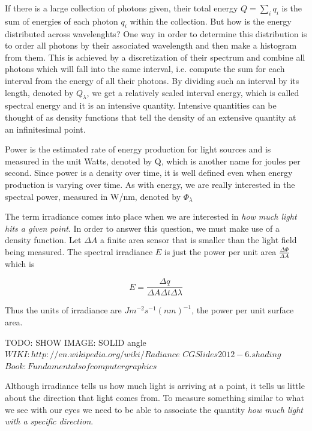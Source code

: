 If there is a large collection of photons given, their total energy $Q = \sum_i q_i$ is the sum of energies of each photon $q_i$ within the collection. But how is the energy distributed across wavelenghts? One way in order to determine this distribution is to order all photons by their associated wavelength and then make a histogram from them. This is achieved by a discretization of their spectrum and combine all photons which will fall into the same interval, i.e. compute the sum for each interval from the energy of all their photons. By dividing such an interval by its length, denoted by $Q_\lambda$, we get a relatively scaled interval energy, which is called spectral energy and it is an intensive quantity. Intensive quantities can be thought of as density functions that tell the density of an extensive quantity at an infinitesimal point.

Power is the estimated rate of energy production for light sources and is measured in the unit Watts, denoted by Q, which is another name for joules per second. Since power is a density over time, it is well defined even when energy production is varying over time. As with energy, we are really interested in the spectral power, measured in W/nm, denoted by $\Phi_\lambda$

The term irradiance comes into place when we are interested in \textit{how much light hits a given point}. In order to answer this question, we must make use of a density function. Let $\Delta A$ a finite area sensor that is smaller than the light field being measured. The spectral irradiance $E$ is just the power per unit area $\frac{\Delta \Phi}{\Delta A}$ which is 

\begin{equation}
 E = \frac{\Delta q}{\Delta A \Delta t \Delta \lambda}
\end{equation}

Thus the units of irradiance are $Jm^{-2}s^{-1}(nm)^{-1}$, the power per unit surface area.


TODO: SHOW IMAGE: SOLID angle
$WIKI: http://en.wikipedia.org/wiki/Radiance$
$CG Slides 2012 - 6.shading$
$Book: Fundamentals of computer graphics$

Although irradiance tells us how much light is arriving at a point, it tells us little about the direction that light comes from. To measure something similar to what we see with our eyes we need to be able to associate the quantity \textit{how much light with a specific direction}. 

